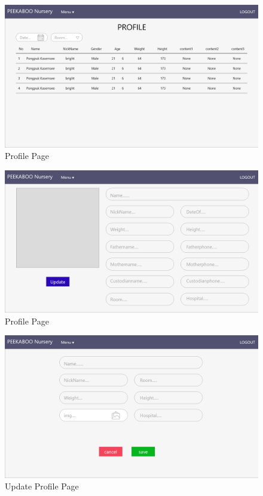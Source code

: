 \begin{figure}
  \begin{center}
  \includegraphics[width=140mm]{images/ProfileOnePage.png}
  \end{center}
  \caption[Poem]{Profile Page}
  \label{fig:walrus}
  \end{figure}

\begin{figure}
  \begin{center}
  \includegraphics[width=140mm]{images/ProfileTwoPage.png}
  \end{center}
  \caption[Poem]{Profile Page}
  \label{fig:walrus}
  \end{figure}

\begin{figure}
  \begin{center}
  \includegraphics[width=140mm]{images/updateprofilePage.png}
  \end{center}
  \caption[Poem]{Update Profile Page}
  \label{fig:walrus}
  \end{figure}

